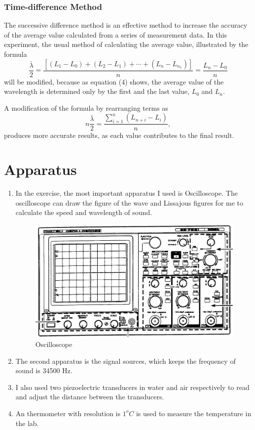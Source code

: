 \documentclass[12pt]{article}
\begin{document}
\subsubsection{Time-difference Method}
The successive difference method is an effective method to increase the accuracy of
the average value calculated from a series of measurement data. In this experiment, the usual method of calculating the average value, illustrated by the formula
\begin{equation}
\frac{\bar{\lambda}}{2}=\frac{[(L_1-L_0)+(L_2-L_1)+\cdots+(L_n-L_{n_1})]}{n}=\frac{L_n-L_0}{n}
\end{equation}
will be modified, because as equation (4) shows, the average value of the wavelength is determined only by the first and the last value, $L_0$ and $L_n$.
\par A modification of the formula by rearranging terms as
\begin{equation}
n\frac{\bar{\lambda}}{2}=\frac{\sum_{i=1}^n(L_{n+i}-L_i)}{n},
\end{equation}
produces more accurate results, as each value contributes to the final result.
\section{Apparatus}
\begin{enumerate}
\item In the exercise, the most important apparatus I used is Oscilloscope. The oscilloscope can draw the figure of the wave and Lissajous figures for me to calculate the speed and wavelength of sound.
\begin{figure}[H]
\centering
\includegraphics[scale=0.5]{P4.jpg}
\caption{Oscilloscope}
\end{figure}
\item The second apparatus is the signal sources, which keeps the frequency of sound is 34500 Hz.
\item I also used two piezoelectric transducers in water and air respectively to read and adjust the distance between the transducers.
\item An thermometer with resolution is $1^oC$ is used to measure the temperature in the lab.
\end{enumerate}
\end{document}
